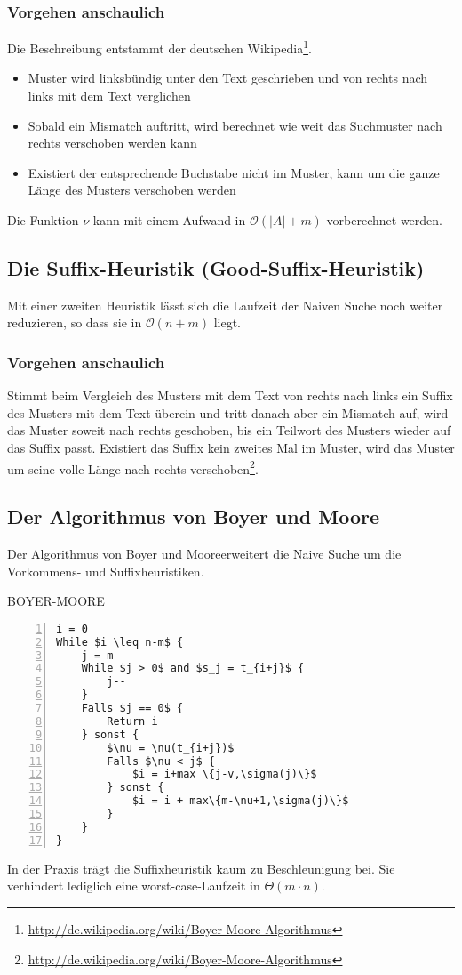 \subsubsection{Vorgehen anschaulich}
Die Beschreibung entstammt der deutschen Wikipedia\footnote{\url{http://de.wikipedia.org/wiki/Boyer-Moore-Algorithmus}}.
\begin{itemize}
	\item Muster wird linksbündig unter den Text geschrieben und von rechts nach links mit dem Text verglichen
	\item Sobald ein Mismatch auftritt, wird berechnet wie weit das Suchmuster nach rechts verschoben werden kann
	\item Existiert der entsprechende Buchstabe nicht im Muster, kann um die ganze Länge des Musters verschoben werden
\end{itemize}
Die Funktion \(\nu\) kann mit einem Aufwand in \(\mathcal{O}(|A|+m)\) vorberechnet werden.


\subsection{Die Suffix-Heuristik (Good-Suffix-Heuristik)}
Mit einer zweiten Heuristik lässt sich die Laufzeit der Naiven Suche noch weiter reduzieren, so dass sie in \(\mathcal{O}(n+m)\) liegt.

\subsubsection{Vorgehen anschaulich}
Stimmt beim Vergleich des Musters mit dem Text von rechts nach links ein Suffix des Musters mit dem Text überein und tritt danach aber ein Mismatch auf, wird das Muster soweit nach rechts geschoben, bis ein Teilwort des Musters wieder auf das Suffix passt. Existiert das Suffix kein zweites Mal im Muster, wird das Muster um seine volle Länge nach rechts verschoben\footnote{\url{http://de.wikipedia.org/wiki/Boyer-Moore-Algorithmus}}.


\subsection{Der Algorithmus von Boyer und Moore}
Der Algorithmus von Boyer und Mooreerweitert die Naive Suche um die Vorkommens- und Suffixheuristiken.

\begin{minipage}{\textwidth}
BOYER-MOORE
\begin{lstlisting}[frame=single,numbers=left,mathescape]
i = 0
While $i \leq n-m$ {
	j = m
	While $j > 0$ and $s_j = t_{i+j}$ {
		j--
	}
	Falls $j == 0$ {
		Return i
	} sonst {
		$\nu = \nu(t_{i+j})$
		Falls $\nu < j$ {
			$i = i+max \{j-v,\sigma(j)\}$
		} sonst {
			$i = i + max\{m-\nu+1,\sigma(j)\}$
		}
	}
}
\end{lstlisting}
\end{minipage}
In der Praxis trägt die Suffixheuristik kaum zu Beschleunigung bei. Sie verhindert lediglich eine worst-case-Laufzeit in \(\Theta(m\cdot n)\).


